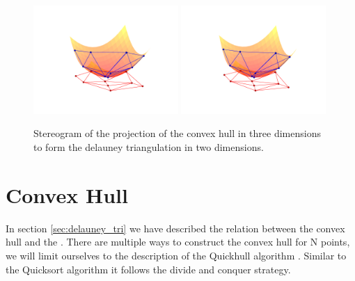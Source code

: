 \begin{figure}[tb] %
   \centering
   \includegraphics[width=0.49\textwidth]{chapter_ndinterp/plots/delauney_project_left.pdf} 
   \hspace{-1.5cm}
   \includegraphics[width=0.49\textwidth]{chapter_ndinterp/plots/delauney_project_right.pdf} 
   \caption[Stereogram of the projection of the convex hull in three dimensions]{Stereogram \citep[produced using a method described in ][]{Vogt11} of the projection of the convex hull in three dimensions to form the delauney triangulation in two dimensions.}
   \label{fig:delauney_projection}
\end{figure}

\section{Convex Hull}
In section \ref{sec:delauney_tri} we have described the relation between the convex hull  and the \deltri. There are multiple ways to construct the convex hull for N points, we will limit ourselves to the description of the Quickhull algorithm \citep{Barber96thequickhull}. Similar to the Quicksort algorithm it follows the divide and conquer strategy. 


